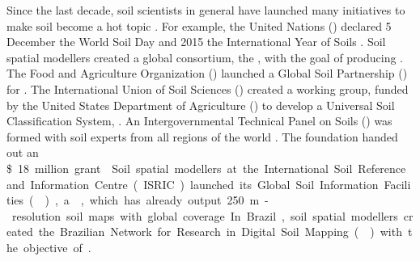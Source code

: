 Since the last decade, soil scientists in general have launched many initiatives to make soil become a hot 
topic \cite{HarteminkEtAl2008}. For example, the United Nations (\WorldSoilDay) declared 5 December the World 
Soil Day and 2015 the International Year of Soils . Soil spatial modellers created a global consortium, the \gsm, with 
the goal of producing . The Food and Agriculture Organization (\fao) launched a Global Soil Partnership (\gsp) for 
. The International Union of Soil 
Sciences (\iussusc) created a working group, funded by the United States Department of Agriculture (\usdausc) 
to develop a Universal Soil Classification System, . An Intergovernmental Technical Panel on Soils (\itps) was formed with soil experts from all 
regions of the world . The 
\gates{} foundation handed out an \SI{18}[\$]~million grant . Soil spatial modellers at the International Soil Reference 
and Information Centre (ISRIC) launched its Global Soil Information Facilities (\gsif), a , which has already output \SI{250}{\m}-resolution soil maps with global coverage. 
In Brazil, soil spatial modellers created the Brazilian Network for Research in Digital Soil Mapping (\redemds) 
with the objective of .


